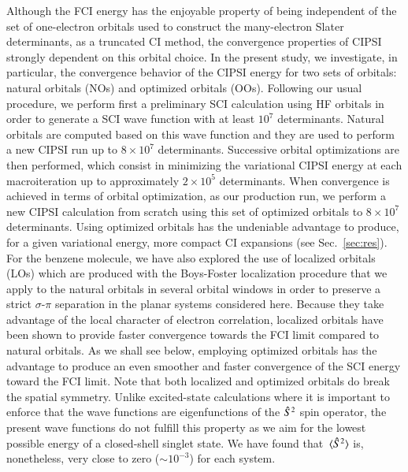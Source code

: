 \documentclass[aip,jcp,reprint,noshowkeys,superscriptaddress,floatfix]{revtex4-1}
\begin{document}
Although the FCI energy has the enjoyable property of being independent of the set of one-electron orbitals used to construct the many-electron Slater determinants, as a truncated CI method, the convergence properties of CIPSI strongly dependent on this orbital choice.
In the present study, we investigate, in particular, the convergence behavior of the CIPSI energy for two sets of orbitals: natural orbitals (NOs) and optimized orbitals (OOs).
Following our usual procedure, \cite{Scemama_2018,Scemama_2018b,Scemama_2019,Loos_2018a,Loos_2019,Loos_2020a,Loos_2020b,Loos_2020c,Loos_2020e} we perform first a preliminary SCI calculation using HF orbitals in order to generate a SCI wave function with at least $10^7$ determinants.
Natural orbitals are computed based on this wave function and they are used to perform a new CIPSI run up to $8 \times 10^7$ determinants.
Successive orbital optimizations are then performed, which consist in minimizing the variational CIPSI energy at each macroiteration up to approximately $2 \times 10^5$ determinants.
When convergence is achieved in terms of orbital optimization, as our production run, we perform a new CIPSI calculation from scratch using this set of optimized orbitals to $8 \times 10^7$ determinants.
Using optimized orbitals has the undeniable advantage to produce, for a given variational energy, more compact CI expansions (see Sec.~\ref{sec:res}).
For the benzene molecule, we have also explored the use of localized orbitals (LOs) which are produced with the Boys-Foster localization procedure \cite{Boys_1960} that we apply to the natural orbitals in several orbital windows in order to preserve a strict $\sigma$-$\pi$ separation in the planar systems considered here. \cite{Loos_2020e}
Because they take advantage of the local character of electron correlation, localized orbitals have been shown to provide faster convergence towards the FCI limit compared to natural orbitals. \cite{Angeli_2003,Angeli_2009,BenAmor_2011,Suaud_2017,Chien_2018,Eriksen_2020,Loos_2020e}
As we shall see below, employing optimized orbitals has the advantage to produce an even smoother and faster convergence of the SCI energy toward the FCI limit.
Note that both localized and optimized orbitals do break the spatial symmetry.
Unlike excited-state calculations where it is important to enforce that the wave functions are eigenfunctions of the $\Hat{S}^2$ spin operator, \cite{Chilkuri_2021} the present wave functions do not fulfill this property as we aim for the lowest possible energy of a closed-shell singlet state.
We have found that $\expval*{\Hat{S}^2}$ is, nonetheless, very close to zero ($\sim 10^{-3}$) for each system.
\end{document}
